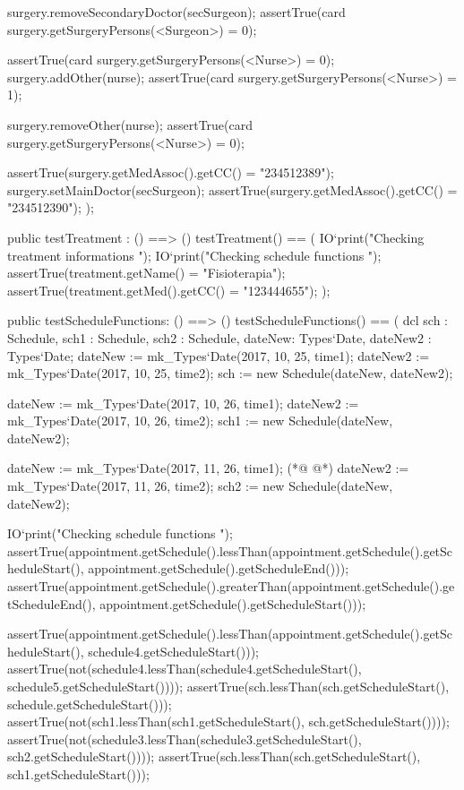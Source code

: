 \begin{vdmpp}[breaklines=true]
   surgery.removeSecondaryDoctor(secSurgeon);
   assertTrue(card surgery.getSurgeryPersons(<Surgeon>) = 0);
   
   assertTrue(card surgery.getSurgeryPersons(<Nurse>) = 0);
   surgery.addOther(nurse);
   assertTrue(card surgery.getSurgeryPersons(<Nurse>) = 1);
   
   surgery.removeOther(nurse);
   assertTrue(card surgery.getSurgeryPersons(<Nurse>) = 0);
   
   assertTrue(surgery.getMedAssoc().getCC() = "234512389");
   surgery.setMainDoctor(secSurgeon);
   assertTrue(surgery.getMedAssoc().getCC() = "234512390");
 );
 
 public testTreatment : () ==> ()
  testTreatment() == (
   IO`print("\n Checking treatment informations \n");
   IO`print("\n Checking schedule functions \n");
   assertTrue(treatment.getName() = "Fisioterapia");
   assertTrue(treatment.getMed().getCC() = "123444655");
  );
  
  public testScheduleFunctions: () ==> ()
  testScheduleFunctions() == (
   dcl sch : Schedule, sch1 : Schedule, sch2 : Schedule, dateNew: Types`Date, dateNew2 : Types`Date;
   dateNew := mk_Types`Date(2017, 10, 25, time1);
   dateNew2 := mk_Types`Date(2017, 10, 25, time2);
   sch := new Schedule(dateNew, dateNew2);
   
   dateNew := mk_Types`Date(2017, 10, 26, time1);
   dateNew2 := mk_Types`Date(2017, 10, 26, time2);
   sch1 := new Schedule(dateNew, dateNew2);
   
   dateNew := mk_Types`Date(2017, 11, 26, time1);
(*@
\label{testSurgery:225}
@*)
   dateNew2 := mk_Types`Date(2017, 11, 26, time2);
   sch2 := new Schedule(dateNew, dateNew2);
   
   IO`print("\n Checking schedule functions \n");
   assertTrue(appointment.getSchedule().lessThan(appointment.getSchedule().getScheduleStart(), appointment.getSchedule().getScheduleEnd()));
   assertTrue(appointment.getSchedule().greaterThan(appointment.getSchedule().getScheduleEnd(), appointment.getSchedule().getScheduleStart()));
   
   assertTrue(appointment.getSchedule().lessThan(appointment.getSchedule().getScheduleStart(), schedule4.getScheduleStart()));
   assertTrue(not(schedule4.lessThan(schedule4.getScheduleStart(), schedule5.getScheduleStart())));
   assertTrue(sch.lessThan(sch.getScheduleStart(), schedule.getScheduleStart()));
   assertTrue(not(sch1.lessThan(sch1.getScheduleStart(), sch.getScheduleStart())));
   assertTrue(not(schedule3.lessThan(schedule3.getScheduleStart(), sch2.getScheduleStart())));
   assertTrue(sch.lessThan(sch.getScheduleStart(), sch1.getScheduleStart()));
   

\end{vdmpp}
